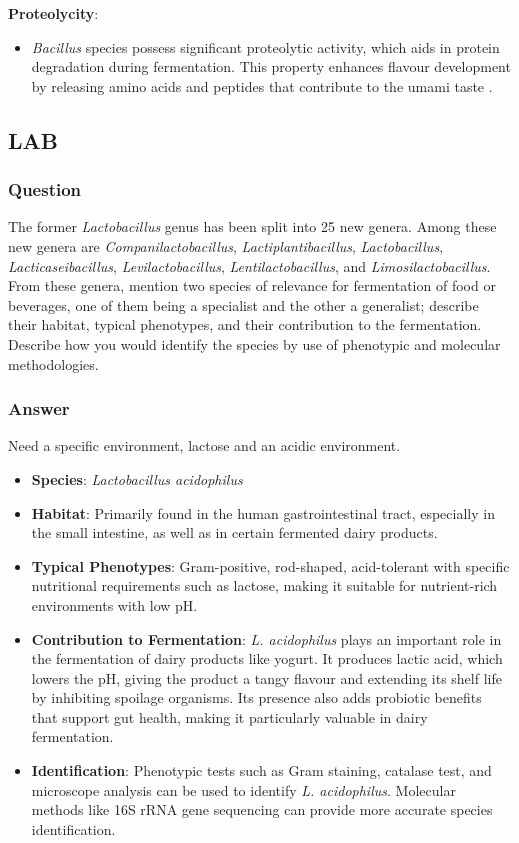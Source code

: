 \textbf{Proteolycity}: 
\begin{itemize}
    \item \textit{Bacillus} species possess significant proteolytic activity, which aids in protein degradation during fermentation. This property enhances flavour development by releasing amino acids and peptides that contribute to the umami taste \cite*{L8-ImpQuorum}.
\end{itemize}

\subsection{LAB}
\subsubsection*{Question}
The former \textit{Lactobacillus} genus has been split into 25 new genera. Among these new genera are \textit{Companilactobacillus}, \textit{Lactiplantibacillus}, \textit{Lactobacillus}, \textit{Lacticaseibacillus}, \textit{Levilactobacillus}, \textit{Lentilactobacillus}, and \textit{Limosilactobacillus}. From these genera, mention two species of relevance for fermentation of food or beverages, one of them being a specialist and the other a generalist; describe their habitat, typical phenotypes, and their contribution to the fermentation. Describe how you would identify the species by use of phenotypic and molecular methodologies.

\subsubsection*{Answer}
Need a specific environment, lactose and an acidic environment.
\begin{itemize}
    \item \textbf{Species}: \textit{Lactobacillus acidophilus}
    \item \textbf{Habitat}: Primarily found in the human gastrointestinal tract, especially in the small intestine, as well as in certain fermented dairy products.
    \item \textbf{Typical Phenotypes}: Gram-positive, rod-shaped, acid-tolerant with specific nutritional requirements such as lactose, making it suitable for nutrient-rich environments with low pH.
    \item \textbf{Contribution to Fermentation}: \textit{L. acidophilus} plays an important role in the fermentation of dairy products like yogurt. It produces lactic acid, which lowers the pH, giving the product a tangy flavour and extending its shelf life by inhibiting spoilage organisms. Its presence also adds probiotic benefits that support gut health, making it particularly valuable in dairy fermentation.
    \item \textbf{Identification}: Phenotypic tests such as Gram staining, catalase test, and microscope analysis can be used to identify \textit{L. acidophilus}. Molecular methods like 16S rRNA gene sequencing can provide more accurate species identification.
\end{itemize}

